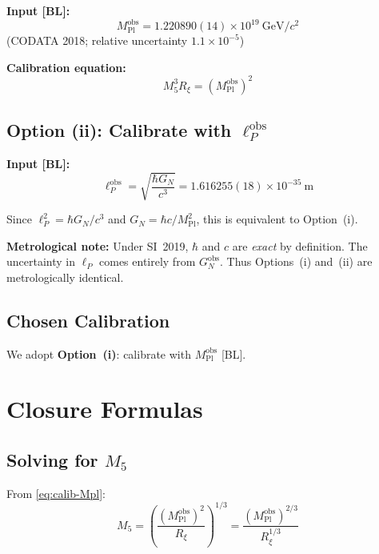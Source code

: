 \documentclass[11pt,a4paper]{article}
\newcommand{\Mpl}{M_{\text{Pl}}}
\newcommand{\Mfive}{M_5}
\newcommand{\GN}{G_N}
\newcommand{\Rxi}{R_\xi}
\newcommand{\ellP}{\ell_P}
\newcommand{\obs}{\text{obs}}
\begin{document}
\textbf{Input [BL]:}
\begin{equation}
\Mpl^{\obs} = 1.220890(14) \times 10^{19}~\text{GeV}/c^2
\end{equation}
(CODATA 2018; relative uncertainty $1.1 \times 10^{-5}$)

\textbf{Calibration equation:}
\begin{equation}
\label{eq:calib-Mpl}
\Mfive^3 \Rxi = (\Mpl^{\obs})^2
\end{equation}

\subsection{Option (ii): Calibrate with $\ellP^{\obs}$}

\textbf{Input [BL]:}
\begin{equation}
\ellP^{\obs} = \sqrt{\frac{\hbar \GN}{c^3}} = 1.616255(18) \times 10^{-35}~\text{m}
\end{equation}

Since $\ellP^2 = \hbar \GN / c^3$ and $\GN = \hbar c / \Mpl^2$, this is
equivalent to Option~(i).

\textbf{Metrological note:} Under SI~2019, $\hbar$ and $c$ are \emph{exact}
by definition. The uncertainty in $\ellP$ comes entirely from $\GN^{\obs}$.
Thus Options~(i) and~(ii) are metrologically identical.

\subsection{Chosen Calibration}

We adopt \textbf{Option~(i)}: calibrate with $\Mpl^{\obs}$ [BL].

\section{Closure Formulas}
\label{sec:closure}

\subsection{Solving for $\Mfive$}

From \eqref{eq:calib-Mpl}:
\begin{equation}
\label{eq:M5-solution}
\boxed{
\Mfive = \left( \frac{(\Mpl^{\obs})^2}{\Rxi} \right)^{1/3}
= \frac{(\Mpl^{\obs})^{2/3}}{\Rxi^{1/3}}
}
\end{equation}
\end{document}
